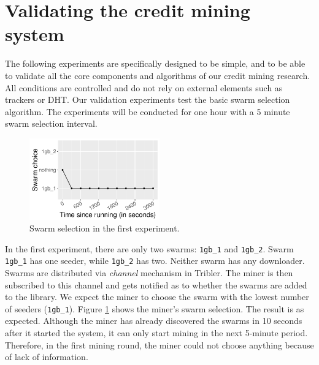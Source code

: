 \section{Validating the credit mining system}
\label{section:cmsvalidation}
The following experiments are specifically designed to be simple, and to be able to validate all the core components and algorithms of our credit mining research. All conditions are controlled and do not rely on external elements such as trackers or DHT. Our validation experiments test the basic swarm selection algorithm. The experiments will be conducted for one hour with a 5 minute swarm selection interval. 

\begin{figure}[h]
	\centering
	\includegraphics[width=0.5\textwidth]{pics/results/val0.pdf}
	\caption{Swarm selection in the first experiment.}
	\label{fig:val0}
\end{figure}

In the first experiment, there are only two swarms: \texttt{1gb\_1} and \texttt{1gb\_2}. Swarm \texttt{1gb\_1} has one seeder, while \texttt{1gb\_2} has two. Neither swarm has any downloader. Swarms are distributed via \textit{channel} mechanism in Tribler. The miner is then subscribed to this channel and gets notified as to whether the swarms are added to the library. We expect the miner to choose the swarm with the lowest number of seeders (\texttt{1gb\_1}). Figure \ref{fig:val0} shows the miner's swarm selection. The result is as expected. Although the miner has already discovered the swarms in 10 seconds after it started the system, it can only start mining in the next 5-minute period. Therefore, in the first mining round, the miner could not choose anything because of lack of information.

